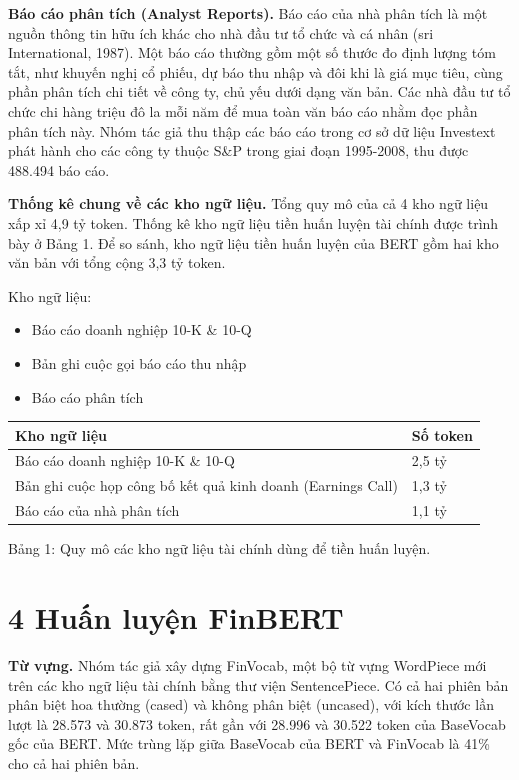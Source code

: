 \textbf{Báo cáo phân tích (Analyst Reports).} Báo cáo của nhà phân tích là một nguồn thông tin hữu ích khác cho nhà đầu tư tổ chức và cá nhân (sri International, 1987). Một báo cáo thường gồm một số thước đo định lượng tóm tắt, như khuyến nghị cổ phiếu, dự báo thu nhập và đôi khi là giá mục tiêu, cùng phần phân tích chi tiết về công ty, chủ yếu dưới dạng văn bản. Các nhà đầu tư tổ chức chi hàng triệu đô la mỗi năm để mua toàn văn báo cáo nhằm đọc phần phân tích này. Nhóm tác giả thu thập các báo cáo trong cơ sở dữ liệu Investext phát hành cho các công ty thuộc S\&P trong giai đoạn 1995-2008, thu được 488.494 báo cáo.

\textbf{Thống kê chung về các kho ngữ liệu.} Tổng quy mô của cả 4 kho ngữ liệu xấp xỉ 4,9 tỷ token. Thống kê kho ngữ liệu tiền huấn luyện tài chính được trình bày ở Bảng 1. Để so sánh, kho ngữ liệu tiền huấn luyện của BERT gồm hai kho văn bản với tổng cộng 3,3 tỷ token.

Kho ngữ liệu:

\begin{itemize}
\item
  Báo cáo doanh nghiệp 10-K \& 10-Q
\item
  Bản ghi cuộc gọi báo cáo thu nhập
\item
  Báo cáo phân tích
\end{itemize}

{\small
\begin{longtable}[]{@{}ll@{}}
\toprule\noalign{}
Kho ngữ liệu & Số token \\
\midrule\noalign{}
\endhead
\bottomrule\noalign{}
\endlastfoot
Báo cáo doanh nghiệp 10-K \& 10-Q & 2,5 tỷ \\
Bản ghi cuộc họp công bố kết quả kinh doanh (Earnings Call) & 1,3 tỷ \\
Báo cáo của nhà phân tích & 1,1 tỷ \\
\end{longtable}
}

Bảng 1: Quy mô các kho ngữ liệu tài chính dùng để tiền huấn luyện.

\section{4 Huấn luyện FinBERT}

\textbf{Từ vựng.} Nhóm tác giả xây dựng FinVocab, một bộ từ vựng WordPiece mới trên các kho ngữ liệu tài chính bằng thư viện SentencePiece. Có cả hai phiên bản phân biệt hoa thường (cased) và không phân biệt (uncased), với kích thước lần lượt là 28.573 và 30.873 token, rất gần với 28.996 và 30.522 token của BaseVocab gốc của BERT. Mức trùng lặp giữa BaseVocab của BERT và FinVocab là 41\% cho cả hai phiên bản.

